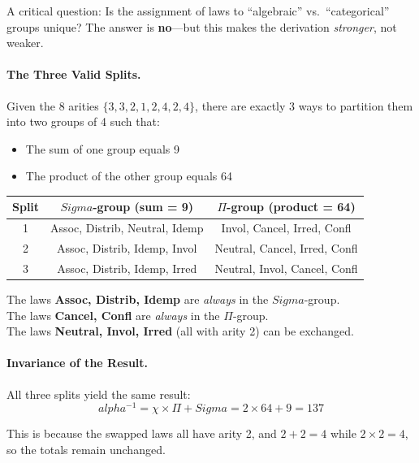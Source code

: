 \documentclass[11pt,a4paper]{book}
\def\Sigma{Sigma}%
\def\alpha{alpha}%
\begin{document}
A critical question: Is the assignment of laws to ``algebraic'' vs.\ ``categorical''
groups unique? The answer is \textbf{no}—but this makes the derivation 
\emph{stronger}, not weaker.

\paragraph{The Three Valid Splits.}

Given the 8 arities $\{3, 3, 2, 1, 2, 4, 2, 4\}$, there are exactly 3 ways 
to partition them into two groups of 4 such that:
\begin{itemize}
\item The sum of one group equals 9
\item The product of the other group equals 64
\end{itemize}

\begin{center}
\begin{tabular}{ccc}
\textbf{Split} & $\Sigma$\textbf{-group (sum = 9)} & $\Pi$\textbf{-group (product = 64)} \\
\hline
1 & Assoc, Distrib, Neutral, Idemp & Invol, Cancel, Irred, Confl \\
2 & Assoc, Distrib, Idemp, Invol & Neutral, Cancel, Irred, Confl \\
3 & Assoc, Distrib, Idemp, Irred & Neutral, Invol, Cancel, Confl \\
\end{tabular}
\end{center}

The laws \textbf{Assoc, Distrib, Idemp} are \emph{always} in the $\Sigma$-group.\\
The laws \textbf{Cancel, Confl} are \emph{always} in the $\Pi$-group.\\
The laws \textbf{Neutral, Invol, Irred} (all with arity 2) can be exchanged.

\paragraph{Invariance of the Result.}

All three splits yield the same result:
$$\alpha^{-1} = \chi \times \Pi + \Sigma = 2 \times 64 + 9 = 137$$

This is because the swapped laws all have arity 2, and $2 + 2 = 4$ while 
$2 \times 2 = 4$, so the totals remain unchanged.
\end{document}
